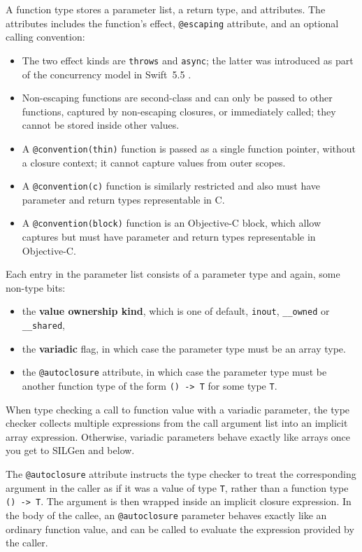 \documentclass[a4paper,headsepline,bibliography=totoc,toc=flat,fleqn,twoside=semi]{scrbook}
\theoremstyle{definition}
\theoremstyle{definition}
\theoremstyle{definition}
\begin{document}
A function type stores a parameter list, a return type, and attributes. The attributes includes the function's effect, \texttt{@escaping} attribute, and an optional calling convention:
\begin{itemize}
\item The two effect kinds are \texttt{throws} and \texttt{async}; the latter was introduced as part of the concurrency model in Swift~5.5 \cite{se0296}.
\item Non-escaping functions are second-class and can only be passed to other functions, captured by non-escaping closures, or immediately called; they cannot be stored inside other values.
\item A \texttt{@convention(thin)} function is passed as a single function pointer, without a closure context; it cannot capture values from outer scopes.
\item A \texttt{@convention(c)} function is similarly restricted and also must have parameter and return types representable in C.
\item A \texttt{@convention(block)} function is an Objective-C block, which allow captures but must have parameter and return types representable in Objective-C.
\end{itemize}

Each entry in the parameter list consists of a parameter type and again, some non-type bits:
\begin{itemize}
\item the \textbf{value ownership kind}, which is one of default, \texttt{inout}, \texttt{\_\_owned} or \texttt{\_\_shared},
\item the \textbf{variadic} flag, in which case the parameter type must be an array type.
\item the \texttt{@autoclosure} attribute, in which case the parameter type must be another function type of the form \texttt{() -> T} for some type \texttt{T}.
\end{itemize}
When type checking a call to function value with a variadic parameter, the type checker collects multiple expressions from the call argument list into an implicit array expression. Otherwise, variadic parameters behave exactly like arrays once you get to SILGen and below.

The \texttt{@autoclosure} attribute instructs the type checker to treat the corresponding argument in the caller as if it was a value of type \texttt{T}, rather than a function type \texttt{()~->~T}. The argument is then wrapped inside an implicit closure expression. In the body of the callee, an \texttt{@autoclosure} parameter behaves exactly like an ordinary function value, and can be called to evaluate the expression provided by the caller.
\end{document}
